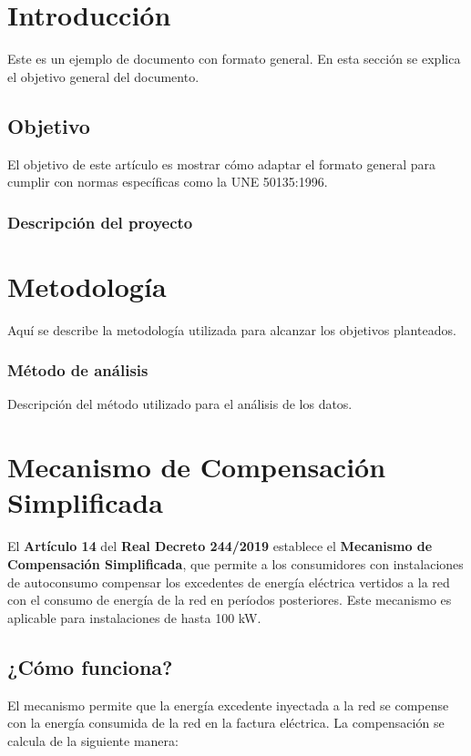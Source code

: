 \documentclass[a4paper,10pt,twocolumn]{article}
\begin{document}
\begin{Form}
	\section{Introducción}
	Este es un ejemplo de documento con formato general. En esta sección se explica el objetivo general del documento.

	\subsection{Objetivo}
	El objetivo de este artículo es mostrar cómo adaptar el formato general para cumplir con normas específicas como la UNE 50135:1996.

	\subsubsection{Descripción del proyecto}
	\lipsum[1] %

	\section{Metodología}
	Aquí se describe la metodología utilizada para alcanzar los objetivos planteados.



	\subsubsection{Método de análisis}
	Descripción del método utilizado para el análisis de los datos.


	\section{Mecanismo de Compensación Simplificada}
	El \textbf{Artículo 14} del \textbf{Real Decreto 244/2019} establece el \textbf{Mecanismo de Compensación Simplificada}, que permite a los consumidores con instalaciones de autoconsumo compensar los excedentes de energía eléctrica vertidos a la red con el consumo de energía de la red en períodos posteriores. Este mecanismo es aplicable para instalaciones de hasta 100 kW.

	\subsection{¿Cómo funciona?}
	El mecanismo permite que la energía excedente inyectada a la red se compense con la energía consumida de la red en la factura eléctrica. La compensación se calcula de la siguiente manera:


\end{Form}
\end{document}
